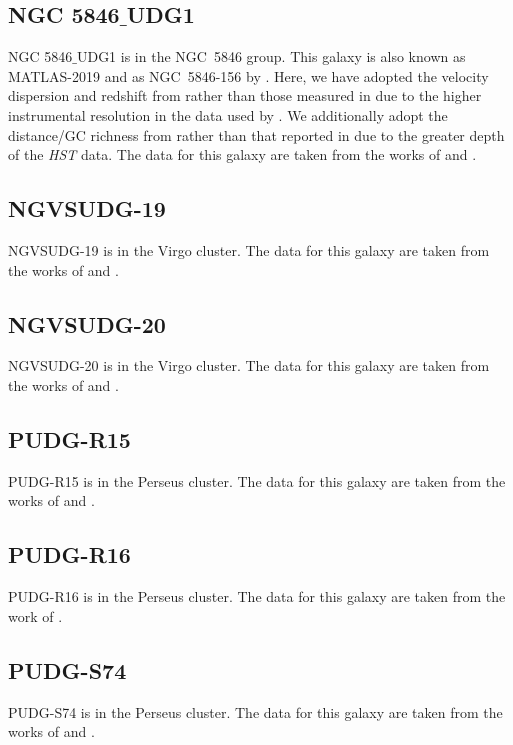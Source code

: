 \subsection{NGC 5846$\_$UDG1}
NGC 5846$\_$UDG1 is in the NGC~5846 group. This galaxy is also known as MATLAS-2019 \citep{Muller2020} and as NGC~5846-156 by \citet{Mahdavi2005}. Here, we have adopted the velocity dispersion and redshift from \cite{Forbes2021} rather than those measured in \cite{Muller2020} due to the higher instrumental resolution in the data used by \citet{Forbes2021}. We additionally adopt the distance/GC richness from \cite{Danieli2022} rather than that reported in \cite{Muller2021} due to the greater depth of the \textit{HST} data. The data for this galaxy are taken from the works of \citet{Forbes2019, Muller2020, Muller2021, Forbes2021, Danieli2022} and \citet{FerreMateu2023}.

\subsection{NGVSUDG-19}
NGVSUDG-19 is in the Virgo cluster. The data for this galaxy are taken from the works of \citet{Lim2020} and \citet{Toloba2023}.

\subsection{NGVSUDG-20}
NGVSUDG-20 is in the Virgo cluster. The data for this galaxy are taken from the works of \citet{Lim2020} and \citet{Toloba2023}.

\subsection{PUDG-R15}
PUDG-R15 is in the Perseus cluster. The data for this galaxy are taken from the works of \citet{Gannon2022} and \citet{FerreMateu2023}. 

\subsection{PUDG-R16}
PUDG-R16 is in the Perseus cluster. The data for this galaxy are taken from the work of \citet{Gannon2022}.

\subsection{PUDG-S74}
PUDG-S74 is in the Perseus cluster. The data for this galaxy are taken from the works of \citet{Gannon2022} and \citet{FerreMateu2023}. 

